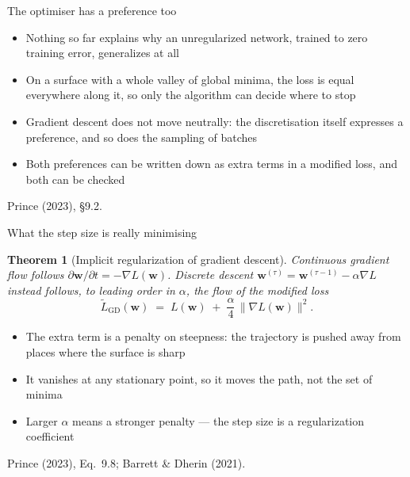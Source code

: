 \documentclass[aspectratio=169, 11pt]{beamer}
\newtheorem{thmx}[theorem]{Theorem}
\newcommand{\srcline}[1]{%
  \par\vspace{0.25em}%
  {\scriptsize\color{mcMuted}\hfill #1\par}}
\begin{document}
\begin{frame}{The optimiser has a preference too}
  \vspace{0.2em}
  \begin{itemize}\itemsep0.38em
    \item Nothing so far explains why an unregularized network, trained
          to zero training error, generalizes at all
    \item On a surface with a whole valley of global minima, the loss is
          equal everywhere along it, so \alert{only the algorithm} can
          decide where to stop
    \item Gradient descent does not move neutrally: the discretisation
          itself expresses a preference, and so does the sampling of
          batches
    \item Both preferences can be written down as extra terms in a
          modified loss, and both can be checked
  \end{itemize}
  \srcline{Prince (2023), \S9.2.}
\end{frame}

\begin{frame}{What the step size is really minimising}
  \vspace{-0.25em}
  \begin{thmx}[Implicit regularization of gradient descent]\label{th:igd}
    \small
    Continuous gradient flow follows
    $\partial \mathbf{w} / \partial t = -\nabla L(\mathbf{w})$. Discrete descent
    $\mathbf{w}^{(\tau)} = \mathbf{w}^{(\tau-1)} - \alpha \nabla L$ instead follows,
    to leading order in $\alpha$, the flow of the \alert{modified} loss
    \[
      \widetilde{L}_{\mathrm{GD}}(\mathbf{w})
        \;=\; L(\mathbf{w}) \;+\; \frac{\alpha}{4}\,
              \big\| \nabla L(\mathbf{w}) \big\|^2 .
    \]
  \end{thmx}
  \vspace{0.05em}
  {\footnotesize
  \begin{itemize}\itemsep0.22em
    \item The extra term is a penalty on \alert{steepness}: the
          trajectory is pushed away from places where the surface is
          sharp
    \item It vanishes at any stationary point, so it moves the path, not
          the set of minima
    \item Larger $\alpha$ means a stronger penalty --- the step size is
          a regularization coefficient
  \end{itemize}}
  \srcline{Prince (2023), Eq.~9.8; Barrett \& Dherin (2021).}
\end{frame}
\end{document}

